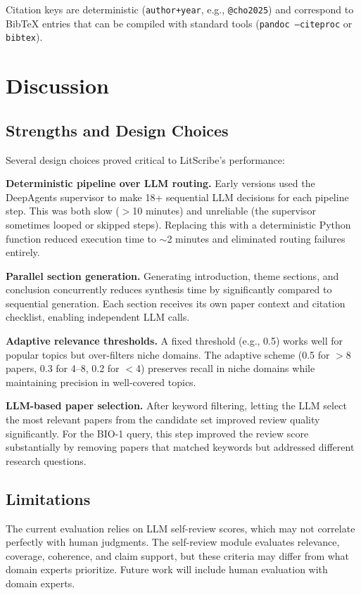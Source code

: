 \documentclass[11pt]{article}
\begin{document}
Citation keys are deterministic (\texttt{author+year}, e.g., \texttt{@cho2025}) and correspond to BibTeX entries that can be compiled with standard tools (\texttt{pandoc --citeproc} or \texttt{bibtex}).

\section{Discussion}

\subsection{Strengths and Design Choices}

Several design choices proved critical to LitScribe's performance:

\textbf{Deterministic pipeline over LLM routing.} Early versions used the DeepAgents supervisor to make 18+ sequential LLM decisions for each pipeline step. This was both slow ($>$10 minutes) and unreliable (the supervisor sometimes looped or skipped steps). Replacing this with a deterministic Python function reduced execution time to $\sim$2 minutes and eliminated routing failures entirely.

\textbf{Parallel section generation.} Generating introduction, theme sections, and conclusion concurrently reduces synthesis time by significantly compared to sequential generation. Each section receives its own paper context and citation checklist, enabling independent LLM calls.

\textbf{Adaptive relevance thresholds.} A fixed threshold (e.g., 0.5) works well for popular topics but over-filters niche domains. The adaptive scheme (0.5 for $>$8 papers, 0.3 for 4--8, 0.2 for $<$4) preserves recall in niche domains while maintaining precision in well-covered topics.

\textbf{LLM-based paper selection.} After keyword filtering, letting the LLM select the most relevant papers from the candidate set improved review quality significantly. For the BIO-1 query, this step improved the review score substantially by removing papers that matched keywords but addressed different research questions.

\subsection{Limitations}

The current evaluation relies on LLM self-review scores, which may not correlate perfectly with human judgments. The self-review module evaluates relevance, coverage, coherence, and claim support, but these criteria may differ from what domain experts prioritize. Future work will include human evaluation with domain experts.
\end{document}
